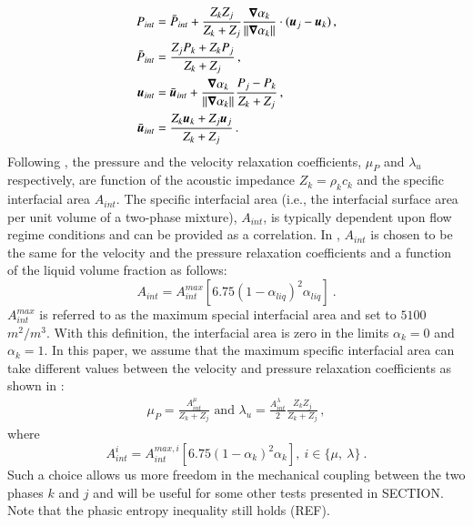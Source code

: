 \documentclass[preprint,10pt]{elsarticle}
\begin{document}
%
\begin{subequations}
\label{eq:int_variables_def}
\begin{align}
  \label{E-R:83}
  P_{int} &= \bar{P}_{int} + \frac{Z_{k}Z_{j}}{Z_{k}+Z_{j}} \frac{\boldsymbol\nabla \alpha_{k}}{|| \boldsymbol\nabla \alpha_{k} ||} \cdot (\boldsymbol u_{j}-\boldsymbol u_{k}) \,,
  \\
  \bar{P}_{int} &= \frac{Z_{j}P_{k}+Z_{k}P_{j}}{Z_{k}+Z_{j}} \,,
 \\
  \label{E-R:84}
  \boldsymbol u_{int} &= \bar{\boldsymbol u}_{int} +  \frac{\boldsymbol\nabla \alpha_{k}}{|| \boldsymbol\nabla \alpha_{k} ||} \frac{P_{j}-P_{k}}{Z_{k}+Z_{j}} \,,
  \\
  \bar{\boldsymbol u}_{int} &= \frac{Z_{k} \boldsymbol u_{k}+Z_{j}\boldsymbol u_{j}}{Z_{k}+Z_{j}} \,.
\end{align}
\end{subequations}
%
Following \cite{SEM}, the pressure and the velocity relaxation coefficients, $\mu_P$  and $\lambda_u$ respectively, are function of the acoustic 
impedance $Z_k = \rho_k c_k$ and the specific interfacial area $A_{int}$. The specific interfacial area (i.e., the interfacial surface area per unit
volume of a two-phase mixture), $A_{int}$, is typically dependent upon flow regime conditions and can be provided as a correlation. In \cite{SEM}, $A_{int}$ is chosen to be the same for the velocity and the pressure relaxation coefficients and a function of the liquid volume fraction as follows:
%
\begin{equation}
A_{int} = A_{int}^{max} \left[ 6.75 \left(1-\alpha_{liq} \right)^2 \alpha_{liq} \right] \ . \nonumber
\end{equation}
% 
$A_{int}^{max}$ is referred to as the maximum special interfacial area and set to $5100$ $m^2 / m^3$. With this definition, the interfacial area is zero in the limits $\alpha_{k} = 0$ and $\alpha_{k} = 1$.
In this paper, we assume that the maximum specific interfacial area can take different values between the velocity and pressure relaxation coefficients as shown in :
%
\begin{subequations}
\label{eq:relaxation_coeff}
\begin{align}
  \label{E-R:86}
  \mu_P = \frac{A_{int}^\mu}{Z_{k}+Z_{j}} 
  \text{ and }
  \lambda_u = \frac{A_{int}^\lambda}{2}  \frac{Z_{k} Z_{j}}{Z_{k}+Z_{j}} \, ,
\end{align}
\end{subequations}
%
where
%
\begin{equation}\label{eq:Aint-sect4}
A_{int}^i = A_{int}^{max,i} \left[ 6.75 \left(1-\alpha_{k} \right)^2 \alpha_{k} \right] , \ i \in \{ \mu, \ \lambda \} \ .
\end{equation}
%
Such a choice allows us more freedom in the mechanical coupling between the two phases $k$ and $j$ and will be useful for some other tests presented in SECTION. Note that the phasic entropy inequality still holds (REF). 
\end{document}
